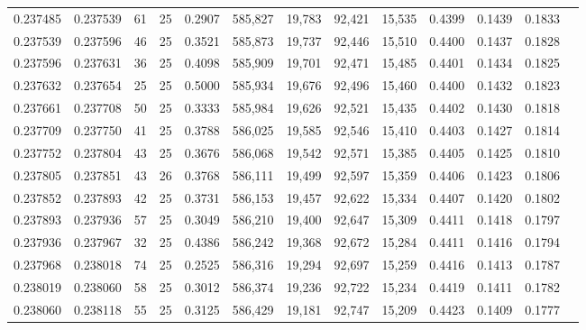 \begin{tabular}{rrrrrrrrrrrrr}
0.237485 & 0.237539 &    61 &  25 &                                     0.2907 & 585,827 &  19,783 &  92,421 &  15,535 & 0.4399 & 0.1439 & 0.1833 \\
0.237539 & 0.237596 &    46 &  25 &                                     0.3521 & 585,873 &  19,737 &  92,446 &  15,510 & 0.4400 & 0.1437 & 0.1828 \\
0.237596 & 0.237631 &    36 &  25 &                                     0.4098 & 585,909 &  19,701 &  92,471 &  15,485 & 0.4401 & 0.1434 & 0.1825 \\
0.237632 & 0.237654 &    25 &  25 &                                     0.5000 & 585,934 &  19,676 &  92,496 &  15,460 & 0.4400 & 0.1432 & 0.1823 \\
0.237661 & 0.237708 &    50 &  25 &                                     0.3333 & 585,984 &  19,626 &  92,521 &  15,435 & 0.4402 & 0.1430 & 0.1818 \\
0.237709 & 0.237750 &    41 &  25 &                                     0.3788 & 586,025 &  19,585 &  92,546 &  15,410 & 0.4403 & 0.1427 & 0.1814 \\
0.237752 & 0.237804 &    43 &  25 &                                     0.3676 & 586,068 &  19,542 &  92,571 &  15,385 & 0.4405 & 0.1425 & 0.1810 \\
0.237805 & 0.237851 &    43 &  26 &                                     0.3768 & 586,111 &  19,499 &  92,597 &  15,359 & 0.4406 & 0.1423 & 0.1806 \\
0.237852 & 0.237893 &    42 &  25 &                                     0.3731 & 586,153 &  19,457 &  92,622 &  15,334 & 0.4407 & 0.1420 & 0.1802 \\
0.237893 & 0.237936 &    57 &  25 &                                     0.3049 & 586,210 &  19,400 &  92,647 &  15,309 & 0.4411 & 0.1418 & 0.1797 \\
0.237936 & 0.237967 &    32 &  25 &                                     0.4386 & 586,242 &  19,368 &  92,672 &  15,284 & 0.4411 & 0.1416 & 0.1794 \\
0.237968 & 0.238018 &    74 &  25 &                                     0.2525 & 586,316 &  19,294 &  92,697 &  15,259 & 0.4416 & 0.1413 & 0.1787 \\
0.238019 & 0.238060 &    58 &  25 &                                     0.3012 & 586,374 &  19,236 &  92,722 &  15,234 & 0.4419 & 0.1411 & 0.1782 \\
0.238060 & 0.238118 &    55 &  25 &                                     0.3125 & 586,429 &  19,181 &  92,747 &  15,209 & 0.4423 & 0.1409 & 0.1777 \\

\end{tabular}
